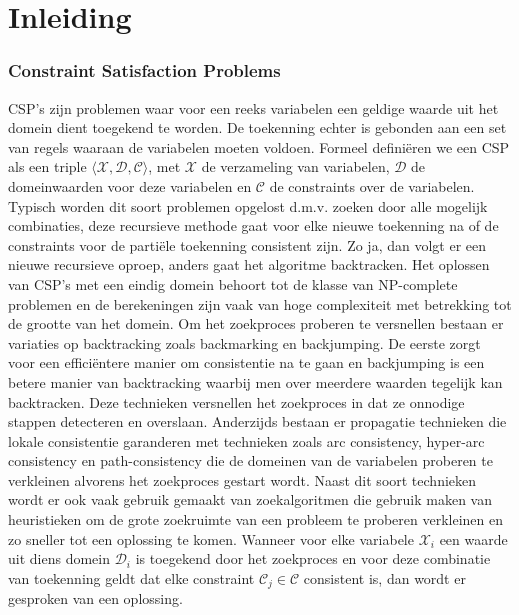 \chapter{Inleiding}
\label{inleiding}

\subsection{Constraint Satisfaction Problems}
CSP's zijn problemen waar voor een reeks variabelen een geldige waarde uit het domein dient toegekend te worden. De toekenning echter is gebonden aan een set van regels waaraan de variabelen moeten voldoen. Formeel defini\"{e}ren we een CSP als een triple $\langle \mathcal{X},\mathcal{D},\mathcal{C} \rangle$, met $\mathcal{X}$ de verzameling van variabelen, $\mathcal{D}$ de domeinwaarden voor deze variabelen en $\mathcal{C}$ de constraints over de variabelen. Typisch worden dit soort problemen opgelost d.m.v. zoeken door alle mogelijk combinaties, deze recursieve methode gaat voor elke nieuwe toekenning na of de constraints voor de parti\"{e}le toekenning consistent zijn. Zo ja, dan volgt er een nieuwe recursieve oproep, anders gaat het algoritme backtracken. Het oplossen van CSP's met een eindig domein behoort tot de klasse van NP-complete problemen en de berekeningen zijn vaak van hoge complexiteit met betrekking tot de grootte van het domein. Om het zoekproces proberen te versnellen bestaan er variaties op backtracking zoals backmarking en backjumping. De eerste zorgt voor een effici\"{e}ntere manier om consistentie na te gaan en backjumping is een betere manier van backtracking waarbij men over meerdere waarden tegelijk kan backtracken. Deze technieken versnellen het zoekproces in dat ze onnodige stappen detecteren en overslaan. Anderzijds bestaan er propagatie technieken die lokale consistentie garanderen met technieken zoals arc consistency, hyper-arc consistency en path-consistency die de domeinen van de variabelen proberen te verkleinen alvorens het zoekproces gestart wordt. Naast dit soort technieken wordt er ook vaak gebruik gemaakt van zoekalgoritmen die gebruik maken van heuristieken om de grote zoekruimte van een probleem te proberen verkleinen en zo sneller tot een oplossing te komen. Wanneer voor elke variabele $\mathcal{X}_{i}$ een waarde uit diens domein $\mathcal{D}_{i}$ is toegekend door het zoekproces en voor deze combinatie van toekenning geldt dat elke constraint $\mathcal{C}_{j} \in \mathcal{C}$ consistent is, dan wordt er gesproken van een oplossing. 

